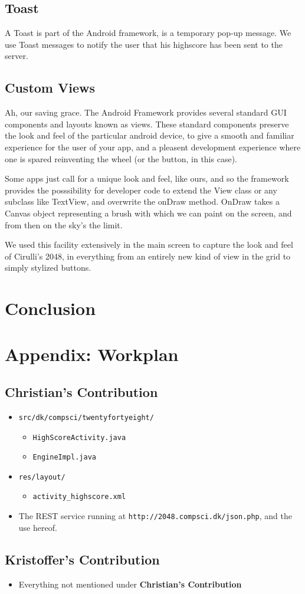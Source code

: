 \documentclass[a4paper, 12pt]{article}
\newcommand{\code}[1]{\texttt{#1}}
\begin{document}
\subsection{Toast}
A Toast is part of the Android framework, is a temporary pop-up
message. We use Toast messages to notify the user that his highscore
has been sent to the server.

\subsection{Custom Views}
Ah, our saving grace. The Android Framework provides several standard
GUI components and layouts known as views. These standard components
preserve the look and feel of the particular android device, to give a
smooth and familiar experience for the user of your app, and a
pleasent development experience where one is spared reinventing the
wheel (or the button, in this case).

Some apps just call for a unique look and feel, like ours, and so the
framework provides the posssibility for developer code to extend the
View class or any subclass like TextView, and overwrite the onDraw
method. OnDraw takes a Canvas object representing a brush with which
we can paint on the screen, and from then on the sky's the limit.

We used this facility extensively in the main screen to capture the
look and feel of Cirulli's 2048, in everything from an entirely new
kind of view in the grid to simply stylized buttons.


\section{Conclusion}

\newpage
\appendix
\section{Appendix: Workplan}
\subsection{Christian's Contribution}
\begin{itemize}
\item \code{src/dk/compsci/twentyfortyeight/}
  \begin{itemize}
  \item \code{HighScoreActivity.java}
  \item \code{EngineImpl.java}
  \end{itemize}
\item \code{res/layout/}
  \begin{itemize}
  \item \code{activity\_highscore.xml}
  \end{itemize}
\item The REST service running at \code{http://2048.compsci.dk/json.php}, and the use hereof.
\end{itemize}
\subsection{Kristoffer's Contribution}
\begin{itemize}
\item Everything not mentioned under \textbf{Christian's Contribution}
\end{itemize}
\end{document}
